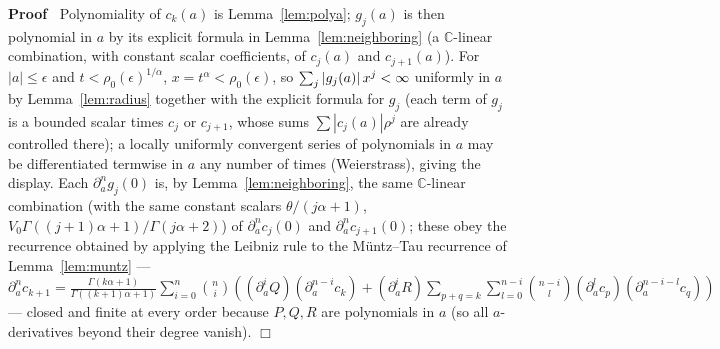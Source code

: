 \documentclass{article}
\newenvironment{proof}{\noindent\textbf{Proof\ }}{\hspace*{\fill}$\Box$\medskip}
\newcommand{\C}{\mathbb{C}}
\begin{document}
\begin{proof}
  Polynomiality of $c_k (a)$ is Lemma~\ref{lem:polya}; $g_j (a)$ is then
  polynomial in $a$ by its explicit formula in Lemma~\ref{lem:neighboring}
  (a $\C$-linear combination, with constant scalar coefficients, of $c_j (a)$
  and $c_{j + 1} (a)$). For $|a | \le \epsilon$ and $t < \rho_0
  (\epsilon)^{1 / \alpha}$, $x = t^{\alpha} < \rho_0 (\epsilon)$, so
  $\sum_j |g_j (a) |  \hspace{0.17em} x^j < \infty$ uniformly in $a$ by
  Lemma~\ref{lem:radius} together with the explicit formula for $g_j$ (each
  term of $g_j$ is a bounded scalar times $c_j$ or $c_{j + 1}$, whose sums
  $\sum |c_j (a) |  \rho^j$ are already controlled there); a locally
  uniformly convergent series of polynomials in $a$ may be differentiated
  termwise in $a$ any number of times (Weierstrass), giving the display.
  Each $\partial_a^n g_j (0)$ is, by Lemma~\ref{lem:neighboring}, the same
  $\C$-linear combination (with the same constant scalars $\theta / (j
  \alpha + 1)$, $V_0 \Gamma ((j + 1) \alpha + 1) / \Gamma (j \alpha + 2)$) of
  $\partial_a^n c_j (0)$ and $\partial_a^n c_{j + 1} (0)$; these obey the
  recurrence obtained by applying the Leibniz rule to the M{\"u}ntz--Tau
  recurrence of Lemma~\ref{lem:muntz} — $\partial_a^n c_{k + 1} = \frac{\Gamma
  (k \alpha + 1)}{\Gamma ((k + 1) \alpha + 1)} \sum_{i = 0}^n \binom{n}{i}
  \left( (\partial_a^i Q)  (\partial_a^{n - i} c_k) + (\partial_a^i R)
  \sum_{p + q = k} \sum_{l = 0}^{n - i} \binom{n - i}{l}
  (\partial_a^l c_p) (\partial_a^{n - i - l} c_q) \right)$ — closed and
  finite at every order because $P, Q, R$ are polynomials in $a$ (so all
  $a$-derivatives beyond their degree vanish).
\end{proof}
\end{document}
